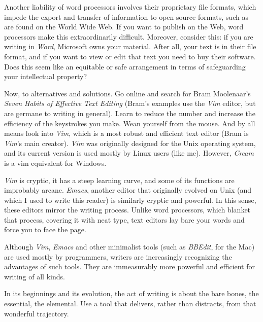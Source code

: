 \documentclass[letterpaper,oneside]{memoir}
\begin{document}
Another liability of word processors involves their proprietary file formats, which impede the export and transfer of information to open source formats, such as are found on the World Wide Web. If you want to publish on the Web, word processors make this extraordinarily difficult. Moreover, consider this: if you are writing in \textit{Word}, Microsoft owns your material. After all, your text is in their file format, and if you want to view or edit that text you need to buy their software. Does this seem like an equitable or safe arrangement in terms of safeguarding your intellectual property?

Now, to alternatives and solutions. Go online and search for Bram Moolenaar's \textit{Seven Habits of Effective Text Editing} (Bram's examples use the \textit{Vim} editor, but are germane to writing in general). Learn to reduce the number and increase the efficiency of the keystrokes you make. Wean yourself from the mouse. And by all means look into \textit{Vim}, which is a most robust and efficient text editor (Bram is \textit{Vim}'s main creator). \textit{Vim} was originally designed for the Unix operating system, and its current version is used mostly by Linux users (like me). However, \textit{Cream} is a vim equivalent for Windows.

\textit{Vim} is cryptic, it has a steep learning curve, and some of its functions are improbably arcane. \textit{Emacs}, another editor that originally evolved on Unix (and which I used to write this reader) is similarly cryptic and powerful. In this sense, these editors mirror the writing process. Unlike word processors, which blanket that process, covering it with neat type, text editors lay bare your words and force you to face the page.

Although \textit{Vim}, \textit{Emacs} and other minimalist tools (such as \textit{BBEdit}, for the Mac) are used mostly by programmers, writers are increasingly recognizing the advantages of such tools. They are immeasurably more powerful and efficient for writing of all kinds.

In its beginnings and its evolution, the act of writing is about the bare bones, the essential, the elemental. Use a tool that delivers, rather than distracts, from that wonderful trajectory.
\newpage
\end{document}
